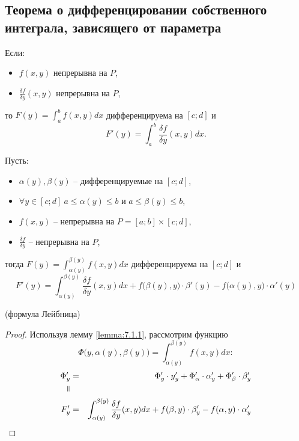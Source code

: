 \subsection{Теорема о дифференцировании собственного интеграла, зависящего от параметра}

\begin{lemma}\label{lemma:7.1.1}
    Если:
    \begin{itemize}
        \item $f(x,y)$ непрерывна на $P$,
        \item $\frac{\delta f}{\delta y}(x,y)$ непрерывна на $P$,
    \end{itemize}
    то $F(y) = \int_{a}^{b}f(x,y)dx$ дифференцируема на $[c;d]$ и
    \[
        F'(y) = \int_{a}^{b}\frac{\delta f}{\delta y}(x,y)dx.
    \]
\end{lemma}

\begin{theorem}\label{theorem:7.1.2}
    Пусть:
    \begin{itemize}
        \item $\alpha(y), \beta(y)$ -- дифференцируемые на $[c;d]$,
        \item $\forall y \in [c;d] \ a\leqslant \alpha(y) \leqslant b$ и $a \leqslant \beta(y) \leqslant b$,
        \item $f(x,y)$ -- непрерывна на $P = [a;b] \times [c;d]$,
        \item $\frac{\delta f}{\delta y}$ -- непрерывна на $P$,
    \end{itemize}
    тогда $F(y) = \int_{\alpha(y)}^{\beta(y)}f(x,y)dx$ дифференцируема на $[c;d]$ и
    \[
        F'(y) = \int_{\alpha(y)}^{\beta(y)}\frac{\delta f}{\delta y}(x,y)dx + f\big(\beta(y),y\big) \cdot \beta'(y) - f\big(\alpha(y),y\big)\cdot \alpha'(y)
    \]
    \begin{center}
        (формула Лейбница)
    \end{center}
\end{theorem}

\begin{proof}
    Используя лемму \ref{lemma:7.1.1}, рассмотрим функцию
    \[
        \Phi\big(y,\alpha(y),\beta(y)\big) = \int_{\alpha(y)}^{\beta(y)}f(x,y)dx:
    \]
    \begin{eqnarray*}
        \Phi_y' & = & \Phi_y' \cdot y_y' + \Phi_\alpha'\cdot\alpha_y' + \Phi_\beta' \cdot \beta_y'                                       \\
        \verteq &   &                                                                                                                    \\
        F_y'    & = & \int_{\alpha(y)}^{\beta(y)}\frac{\delta f}{\delta y}(x,y)dx + f(\beta,y)\cdot \beta_y' - f(\alpha,y)\cdot\alpha_y'
    \end{eqnarray*}
\end{proof}

